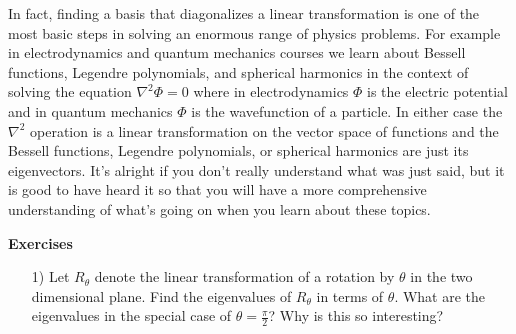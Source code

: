 In fact, finding a basis that diagonalizes a linear transformation is one of the most basic steps in solving an enormous range of physics problems.  For example in electrodynamics and quantum mechanics courses we learn about Bessell functions, Legendre polynomials, and spherical harmonics in the context of solving the equation $\nabla ^2 \Phi = 0$ where in electrodynamics $\Phi$ is the electric potential and in quantum mechanics $\Phi$ is the wavefunction of a particle.  In either case the $\nabla ^2$ operation is a linear transformation on the vector space of functions and the Bessell functions, Legendre polynomials, or spherical harmonics are just its eigenvectors.  It's alright if you don't really understand what was just said, but it is good to have heard it so that you will have a more comprehensive understanding of what's going on when you learn about these topics.

\begin{flushleft}\textbf{Exercises}\end{flushleft}
\begin{itemize}
\item[1)] Let $R_{\theta}$ denote the linear transformation of a rotation by $\theta$ in the two dimensional plane. Find the eigenvalues of $R_{\theta}$ in terms of $\theta$.  What are the eigenvalues in the special case of $\theta = \frac{\pi}{2}$?   Why is this so interesting?
\end{itemize}

